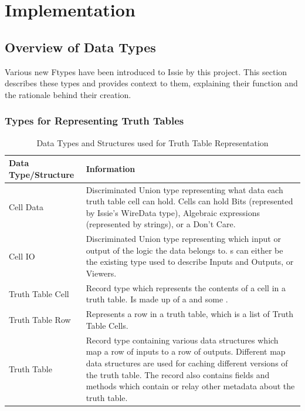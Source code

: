\chapter{Implementation}

\section{Overview of Data Types}
Various new F\fsharp types have been introduced to Issie by this project. This section describes these types and provides context to them, explaining their function and the rationale behind their creation.

\subsection{Types for Representing Truth Tables}
\newcommand{\ttCellData}{
    Discriminated Union type representing what data each truth table cell can hold. Cells can hold Bits (represented by Issie's WireData type), Algebraic expressions (represented by strings), or a Don't Care.
}

\newcommand{\ttCellIO}{
    Discriminated Union type representing which input or output of the logic the data belongs to. \codestyle{CellIO}s can either be the existing \codestyle{SimulationIO} type used to describe Inputs and Outputs, or Viewers.
}

\newcommand{\ttCell}{
    Record type which represents the contents of a cell in a truth table. Is made up of a \codestyle{CellIO} and some \codestyle{CellData}.
}

\newcommand{\ttRow}{
    Represents a row in a truth table, which is a list of Truth Table Cells.
}

\newcommand{\truthtable}{
    Record type containing various \codestyle{Map} data structures which map a row of inputs to a row of outputs. Different map data structures are used for caching different versions of the truth table. The record also contains fields and methods which contain or relay other metadata about the truth table.
}

\begin{table} [h!]
    \centering
    \begin{tabular}{| m{4cm} | m{10cm} |}
        \hline
        \textbf{Data Type/Structure} & \textbf{Information} \\
        \hline
        Cell Data & \ttCellData \\
        \hline
        Cell IO & \ttCellIO \\
        \hline
        Truth Table Cell & \ttCell \\
        \hline
        Truth Table Row & \ttRow \\
        \hline
        Truth Table & \truthtable \\
        \hline
    \end{tabular}
    
    \caption{Data Types and Structures used for Truth Table Representation}
    \label{tab:tabledatastructs}
\end{table} 

